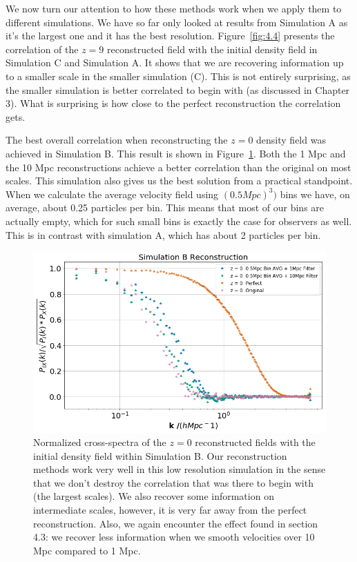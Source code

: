 We now turn our attention to how these methods work when we apply them to different simulations. We have so far only looked at results from Simulation A as it's the largest one and it has the best resolution. Figure~\ref{fig:4.4} presents the correlation of the $z=9$ reconstructed field with the initial density field in Simulation C and Simulation A. It shows that we are recovering information up to a smaller scale in the smaller simulation (C). This is not entirely surprising, as the smaller simulation is better correlated to begin with (as discussed in Chapter 3). What is surprising is how close to the perfect reconstruction the correlation gets.

The best overall correlation when reconstructing the $z=0$ density field was achieved in Simulation B. This result is shown in Figure~\ref{fig:4.5}. Both the 1 Mpc and the 10 Mpc reconstructions achieve a better correlation than the original on most scales. This simulation also gives us the best solution from a practical standpoint. When we calculate the average velocity field using $(0.5 Mpc)^3)$ bins we have, on average, about 0.25 particles per bin. This means that most of our bins are actually empty, which for such small bins is exactly the case for observers as well. This is in contrast with simulation A, which has about 2 particles per bin.

\begin{figure}
    \centering
    \includegraphics[width=1\columnwidth]{images/realRecon/simBRecon.png}%
    
    \caption{
        Normalized cross-spectra of the $z=0$ reconstructed fields with the initial density field within Simulation B. Our reconstruction methods work very well in this low resolution simulation in the sense that we don't destroy the correlation that was there to begin with (the largest scales). We also recover some information on intermediate scales, however, it is very far away from the perfect reconstruction. Also, we again encounter the effect found in section 4.3: we recover less information when we smooth velocities over 10 Mpc compared to 1 Mpc. 
    }
    
    \label{fig:4.5}
\end{figure}

